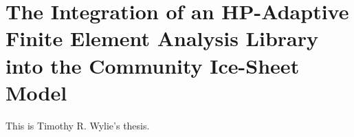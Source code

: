 \newcommand{\figformat}{png}	  %
\newcommand{\figdir}{\dir/figures/\figformat/}  %

\newcommand{\addfigure}[5]{%
\begin{figure}[htbp]
\centering
\texttt{[image: \\figdir\#1.eps]}
\ifthenelse{\equal{#3}{}}
{%
\caption[#4]{#4}
}%
{\caption[#3]{#4}
}%
\label{#5}
\end{figure}
}%


\newcommand{\figformatpdf}{pdf}	  %
\newcommand{\figdirpdf}{\dir/figures/\figformatpdf/}  %

\newcommand{\addfigurepdf}[5]{%
\begin{figure}[htbp]
\centering
\texttt{[image: \\figdirpdf\#1.eps]}
\ifthenelse{\equal{#3}{}}
{%
\caption[#4]{#4}
}%
{\caption[#3]{#4}
}%
\label{#5}
\end{figure}
}%



\chapter{The Integration of an HP-Adaptive Finite Element Analysis Library into the Community Ice-Sheet Model}%
This is Timothy R. Wylie's thesis.







